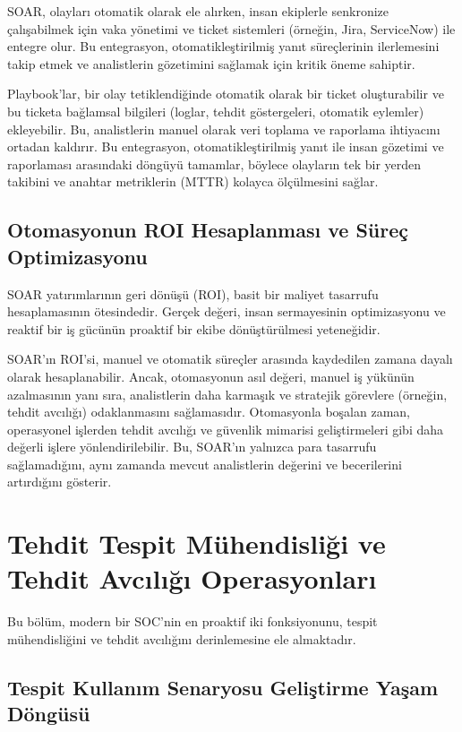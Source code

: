 SOAR, olayları otomatik olarak ele alırken, insan ekiplerle senkronize çalışabilmek için vaka yönetimi ve ticket sistemleri (örneğin, Jira, ServiceNow) ile entegre olur. Bu entegrasyon, otomatikleştirilmiş yanıt süreçlerinin ilerlemesini takip etmek ve analistlerin gözetimini sağlamak için kritik öneme sahiptir.

Playbook'lar, bir olay tetiklendiğinde otomatik olarak bir ticket oluşturabilir ve bu ticketa bağlamsal bilgileri (loglar, tehdit göstergeleri, otomatik eylemler) ekleyebilir. Bu, analistlerin manuel olarak veri toplama ve raporlama ihtiyacını ortadan kaldırır. Bu entegrasyon, otomatikleştirilmiş yanıt ile insan gözetimi ve raporlaması arasındaki döngüyü tamamlar, böylece olayların tek bir yerden takibini ve anahtar metriklerin (MTTR) kolayca ölçülmesini sağlar.

\subsection{Otomasyonun ROI Hesaplanması ve Süreç Optimizasyonu}

SOAR yatırımlarının geri dönüşü (ROI), basit bir maliyet tasarrufu hesaplamasının ötesindedir. Gerçek değeri, insan sermayesinin optimizasyonu ve reaktif bir iş gücünün proaktif bir ekibe dönüştürülmesi yeteneğidir.

SOAR'ın ROI'si, manuel ve otomatik süreçler arasında kaydedilen zamana dayalı olarak hesaplanabilir. Ancak, otomasyonun asıl değeri, manuel iş yükünün azalmasının yanı sıra, analistlerin daha karmaşık ve stratejik görevlere (örneğin, tehdit avcılığı) odaklanmasını sağlamasıdır. Otomasyonla boşalan zaman, operasyonel işlerden tehdit avcılığı ve güvenlik mimarisi geliştirmeleri gibi daha değerli işlere yönlendirilebilir. Bu, SOAR'ın yalnızca para tasarrufu sağlamadığını, aynı zamanda mevcut analistlerin değerini ve becerilerini artırdığını gösterir.

\section{Tehdit Tespit Mühendisliği ve Tehdit Avcılığı Operasyonları}

Bu bölüm, modern bir SOC'nin en proaktif iki fonksiyonunu, tespit mühendisliğini ve tehdit avcılığını derinlemesine ele almaktadır.

\subsection{Tespit Kullanım Senaryosu Geliştirme Yaşam Döngüsü}


